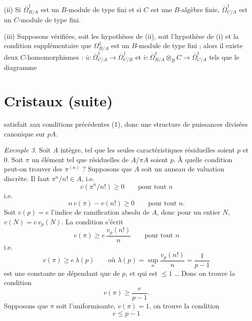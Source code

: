 \documentclass[11pt,a4paper]{article}
\begin{document}
(ii) Si $\overline{\Omega}^1_{B/A}$ est un $B$-module de type fini et si $C$
est une $B$-algèbre finie, $\overline{\Omega}^1_{C/A}$ est un $C$-module de
type fini.

(iii) Supposons vérifiées, soit les hypothèses de (ii), soit \struck{\ill{}}
l'hypothèse de (i) et la condition supplémentaire que $\Omega^1_{B/A}$ est un
$B$-module de type fini ; alors il existe deux $C$-homomorphismes
   : $\bar u : \overline{\Omega}^1_{C/A} \to
\overline{\Omega}^1_{C/B}$ et $\bar v : \overline{\Omega}^1_{B/A} \otimes_B C
\to \overline{\Omega}^1_{C/A}$ tels que le diagramme



\section*{Cristaux (suite)}


satisfait aux conditions précédentes (1), donc une structure de puissances
divisées canonique sur $pA$.

\emph{Exemple 3.} Soit $A$ intègre, \struck{\ill{}} tel que les seules
\struck{\ill{}}  caractéristiques résiduelles
soient $p$ et $0$. Soit $\pi$ un élément tel que 
 résiduelles de $A/\pi A$ soient $p$. À quelle
condition peut-on trouver des $\pi^{(n)}$ ? Supposons que $A$ soit un anneau
de valuation discrète. Il faut \struck{\ill{}} $\pi^n/n! \in A$, i.e.
\[
v(\pi^n/n!) \geq 0 \qquad \text{pour tout } n
\]
i.e.
\[
n\, v(\pi) - v(n!) \geq 0 \qquad \text{pour tout } n .
\]
Soit \struck{\ill{}} $v(p) = e$ l'indice de ramification absolu de $A$, donc
 pour un entier $N$, $v(N) = e\, v_p(N)$.  La condition s'écrit \struck{\ill{}}
\[
v(\pi) \geq e\, \frac{v_p(n!)}{n} \qquad \text{pour tout } n
\]
i.e.
\[
v(\pi) \geq e\, \lambda(p) \qquad \text{où } \lambda(p) = \sup_n
\frac{v_p(n!)}{n} = \frac{1}{p-1}
\]
  est une constante ne dépendant que de $p$, et qui est
$\leq 1$  … Donc on trouve la condition
\[
v(\pi) \geq \frac{e}{p-1} .
\]
Supposons que $\pi$ soit l'uniformisante,  $v(\pi) = 1$, on
trouve la condition
\[
\boxed{e \leq p-1}
\]
\end{document}
